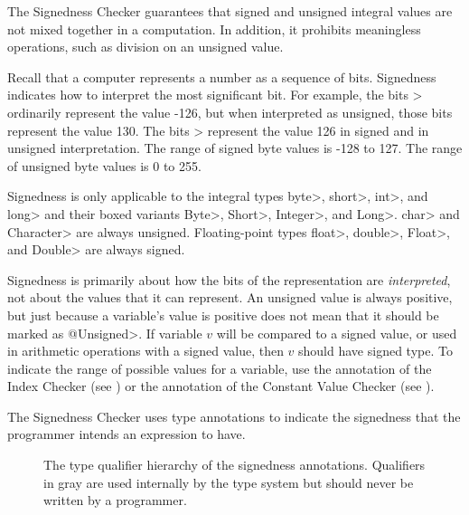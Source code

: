 \htmlhr
{}

The Signedness Checker guarantees that signed and unsigned integral values are not mixed
together in a computation. In addition, it prohibits meaningless operations, such
as division on an unsigned value.

Recall that a computer represents a number as a sequence of bits.
Signedness indicates how to interpret the most significant bit.  For
example, the bits > ordinarily represent the value -126, but when
interpreted as unsigned, those bits represent the value 130.  The bits
> represent the value 126 in signed and in unsigned interpretation.
The range of signed byte values is -128 to 127.  The range of unsigned byte
values is 0 to 255.

Signedness is only applicable to the integral types \<byte>,
\<short>, \<int>, and \<long> and their boxed variants \<Byte>,
\<Short>, \<Integer>, and \<Long>.
\<char> and \<Character> are always unsigned.
Floating-point types \<float>, \<double>, \<Float>, and \<Double> are always signed.

Signedness is primarily about how the bits of the representation are
\emph{interpreted}, not about the values that it can represent.  An unsigned value
is always positive, but just because a variable's value is positive does
not mean that it should be marked as \<@Unsigned>.  If variable $v$ will be
compared to a signed value, or used in arithmetic operations with a signed
value, then $v$ should have signed type.
To indicate the range of possible values for a variable, use the
 annotation of the Index
Checker (see ) or the
 annotation of the Constant Value
Checker (see ).



The Signedness Checker uses type annotations to indicate the signedness that the programmer intends an expression to have.

\begin{figure}
\caption{The type qualifier hierarchy of the signedness annotations.
Qualifiers in gray are used internally by the type system but should never be written by a programmer.}
\label{fig-signedness-hierarchy}
\end{figure}

